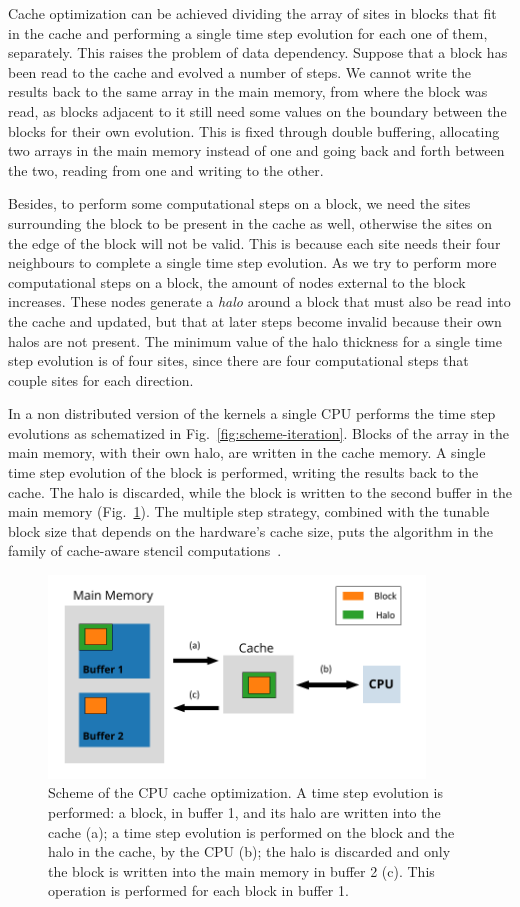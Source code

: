 Cache optimization can be achieved dividing the array of sites in blocks that fit in the cache and performing a single time step evolution for each one of them, separately. This raises the problem of data dependency. Suppose that a block has been read to the cache and evolved a number of steps. We cannot write the results back to the same array in the main memory, from where the block was read, as blocks adjacent to it still need some values on the boundary between the blocks for their own evolution. This is fixed through double buffering, allocating two arrays in the main memory instead of one and going back and forth between the two, reading from one and writing to the other.

Besides, to perform some computational steps on a block, we need the sites surrounding the block to be present in the cache as well, otherwise the sites on the edge of the block will not be valid. This is because each site needs their four neighbours to complete a single time step evolution. As we try to perform more computational steps on a block, the amount of nodes external to the block increases. These nodes generate a \textit{halo} around a block that must also be read into the cache and updated, but that at later steps become invalid because their own halos are not present. The minimum value of the halo thickness for a single time step evolution is of four sites, since there are four computational steps that couple sites for each direction.

In a non distributed version of the kernels a single CPU performs the time step evolutions as schematized in Fig.~\ref{fig:scheme-iteration}. Blocks of the array in the main memory, with their own halo, are written in the cache memory. A single time step evolution of the block is performed, writing the results back to the cache. The halo is discarded, while the block is written to the second buffer in the main memory (Fig.~\ref{fig:CPU-cache-optimization}). The multiple step strategy, combined with the tunable block size that depends on the hardware's cache size, puts the algorithm in the family of cache-aware stencil computations~\cite{kamil2006implicit}.
\begin{figure}
   \centering
   \includegraphics[width=10cm]{Figs/CPU-cache-optimization.pdf}
   \caption{Scheme of the CPU cache optimization. A time step evolution is performed: a block, in buffer 1, and its halo are written into the cache (a); a time step evolution is performed on the block and the halo in the cache, by the CPU (b); the halo is discarded and only the block is written into the main memory in buffer 2 (c). This operation is performed for each block in buffer 1.} \label{fig:CPU-cache-optimization}
\end{figure}

